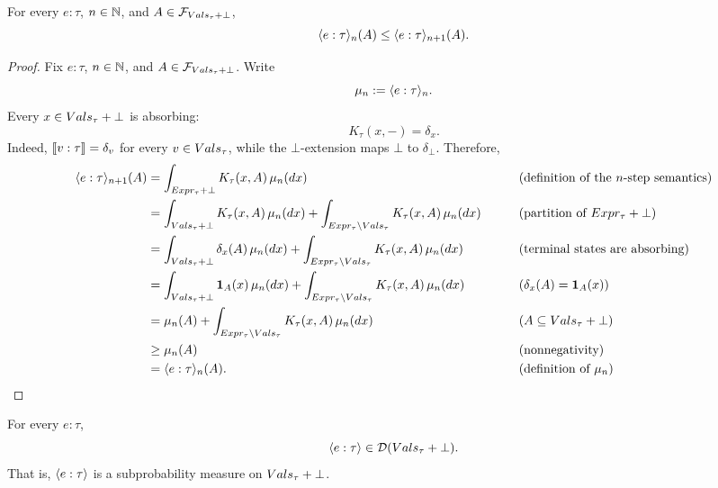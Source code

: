 \begin{lemma}
\label{lem:bigstepsem}
For every \(e:\tau\), \(n\in\mathbb{N}\), and
\(A\in\mathcal F_{Vals_\tau+\bot}\),
\[
\langle e:\tau \rangle_{n}(A)
\leq
\langle e:\tau \rangle_{n+1}(A).
\]
\end{lemma}

\begin{proof}
Fix \(e:\tau\), \(n\in\mathbb{N}\), and
\(A\in\mathcal F_{Vals_\tau+\bot}\). Write
\[
\mu_n:=\langle e:\tau \rangle_{n}.
\]
Every \(x\in Vals_\tau+\bot\) is absorbing:
\[
K_\tau(x,-)=\delta_x.
\]
Indeed, \(\llbracket v:\tau \rrbracket=\delta_v\) for every
\(v\in Vals_\tau\), while the \(\bot\)-extension maps
\(\bot\) to \(\delta_\bot\). Therefore,
\begin{align*}
\bigsemstep{e:\tau}{n+1}(A)
&=
\int_{Expr_\tau+\bot}K_\tau(x,A)\,\mu_n(dx)
&& \tag{definition of the \(n\)-step semantics}
\\
&=
\int_{\vals_\tau+\bot}K_\tau(x,A)\,\mu_n(dx)
+
\int_{Expr_\tau\setminus\vals_\tau}K_\tau(x,A)\,\mu_n(dx)
&& \tag{partition of \(Expr_\tau+\bot\)}
\\
&=
\int_{\vals_\tau+\bot}\delta_x(A)\,\mu_n(dx)
+
\int_{Expr_\tau\setminus\vals_\tau}K_\tau(x,A)\,\mu_n(dx)
&& \tag{terminal states are absorbing}
\\
&=
\int_{\vals_\tau+\bot}\mathbf{1}_A(x)\,\mu_n(dx)
+
\int_{Expr_\tau\setminus\vals_\tau}K_\tau(x,A)\,\mu_n(dx)
&& \tag{\(\delta_x(A)=\mathbf{1}_A(x)\)}
\\
&=
\mu_n(A)
+
\int_{Expr_\tau\setminus\vals_\tau}K_\tau(x,A)\,\mu_n(dx)
&& \tag{\(A\subseteq\vals_\tau+\bot\)}
\\
&\geq
\mu_n(A)
&& \tag{nonnegativity}
\\
&=
\bigsemstep{e:\tau}{n}(A).
&& \tag{definition of \(\mu_n\)}
\end{align*}
\end{proof}


\begin{lemma}
\label{lem:bigstep-well-defined}
For every \(e:\tau\),
\[
\langle e:\tau \rangle\in\mathcal D(Vals_\tau+\bot).
\]
That is, \(\langle e:\tau \rangle\) is a subprobability measure on
\(Vals_\tau+\bot\).
\end{lemma}

